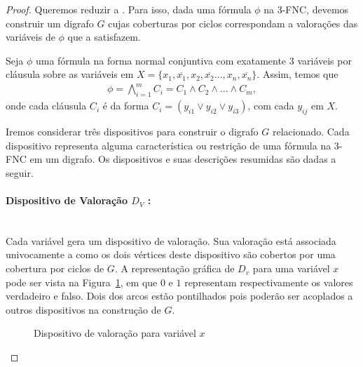 \documentclass[paper=a4, fontsize=11pt]{scrartcl} %
\numberwithin{equation}{subsection}
\numberwithin{figure}{subsection}
\numberwithin{table}{subsection}
\numberwithin{definition}{subsection}
\numberwithin{theorem}{subsection}
\numberwithin{property}{subsection}
\numberwithin{proposition}{subsection}
\newcommand{\prob}[1]{\text{\textsc{\textbf{#1}}}}
\renewcommand{\bar}[1]{\overline{#1}}
\begin{document}
\begin{proof}

Queremos reduzir \prob{\#3sat} a \prob{permanente}. Para isso, dada uma fórmula $\phi$ na 3-FNC, devemos construir um digrafo $ G $ cujas coberturas por ciclos correspondam a valorações das variáveis de $\phi$ que a satisfazem.

Seja $\phi$ uma fórmula na forma normal conjuntiva com exatamente 3 variáveis por cláusula sobre as variáveis em $ X = \{x_1, \bar{x_1}, x_2, \bar{x_2} \dots, x_n, \bar{x_n} \} $. Assim, temos que
\begin{align*}
\phi = \bigwedge\limits_{i = 1}^{m}C_i = C_1 \land C_2 \land \dots \land C_m,
\end{align*}
onde cada cláusula $C_i$ é da forma $C_i = (y_{i1} \lor y_{i2} \lor y_{i3} )$, com cada $y_{ij}$ em $X$.

Iremos considerar três dispositivos para construir o digrafo $ G $ relacionado. Cada dispositivo representa alguma característica ou restrição de uma fórmula na 3-FNC em um digrafo. Os dispositivos e suas descrições resumidas são dadas a seguir.

\paragraph{Dispositivo de Valoração $D_V$ :} \hfill \\

      Cada variável gera um dispositivo de valoração. Sua valoração está associada univocamente a como os dois vértices deste dispositivo são cobertos por uma cobertura por ciclos de $G$. A representação gráfica de $D_v$ para uma variável $x$ pode ser vista na Figura~\ref{fig:Dv}, em que $0$ e $1$ representam respectivamente os valores verdadeiro e falso. Dois dos arcos estão pontilhados pois poderão ser acoplados a outros dispositivos na construção de $G$.
      
\FloatBarrier
\begin{figure}
\centering
{}
\caption{Dispositivo de valoração para variável $x$}
\label{fig:Dv}
\end{figure}


\end{proof}
\end{document}

